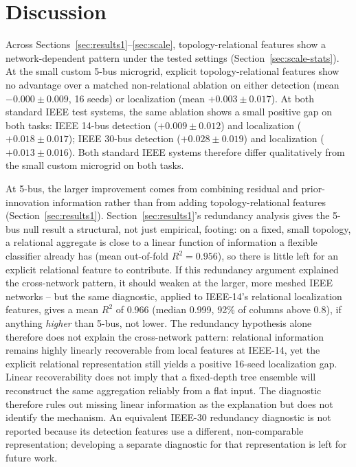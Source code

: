 \documentclass[conference]{IEEEtran}
\begin{document}
\section{Discussion}

Across Sections~\ref{sec:results1}--\ref{sec:scale}, topology-relational features show a network-dependent pattern under the tested settings (Section~\ref{sec:scale-stats}). At the small custom 5-bus microgrid, explicit topology-relational features show no advantage over a matched non-relational ablation on either detection (mean $-0.000\pm0.009$, 16 seeds) or localization (mean $+0.003\pm0.017$). At both standard IEEE test systems, the same ablation shows a small positive gap on both tasks: IEEE 14-bus detection ($+0.009\pm0.012$) and localization ($+0.018\pm0.017$); IEEE 30-bus detection ($+0.028\pm0.019$) and localization ($+0.013\pm0.016$). Both standard IEEE systems therefore differ qualitatively from the small custom microgrid on both tasks.

At 5-bus, the larger improvement comes from combining residual and prior-innovation information rather than from adding topology-relational features (Section~\ref{sec:results1}). Section~\ref{sec:results1}'s redundancy analysis gives the 5-bus null result a structural, not just empirical, footing: on a fixed, small topology, a relational aggregate is close to a linear function of information a flexible classifier already has (mean out-of-fold $R^2 = 0.956$), so there is little left for an explicit relational feature to contribute. If this redundancy argument explained the cross-network pattern, it should weaken at the larger, more meshed IEEE networks -- but the same diagnostic, applied to IEEE-14's relational localization features, gives a mean $R^2$ of 0.966 (median 0.999, 92\% of columns above 0.8), if anything \emph{higher} than 5-bus, not lower. The redundancy hypothesis alone therefore does not explain the cross-network pattern: relational information remains highly linearly recoverable from local features at IEEE-14, yet the explicit relational representation still yields a positive 16-seed localization gap. Linear recoverability does not imply that a fixed-depth tree ensemble will reconstruct the same aggregation reliably from a flat input. The diagnostic therefore rules out missing linear information as the explanation but does not identify the mechanism. An equivalent IEEE-30 redundancy diagnostic is not reported because its detection features use a different, non-comparable representation; developing a separate diagnostic for that representation is left for future work.
\end{document}
